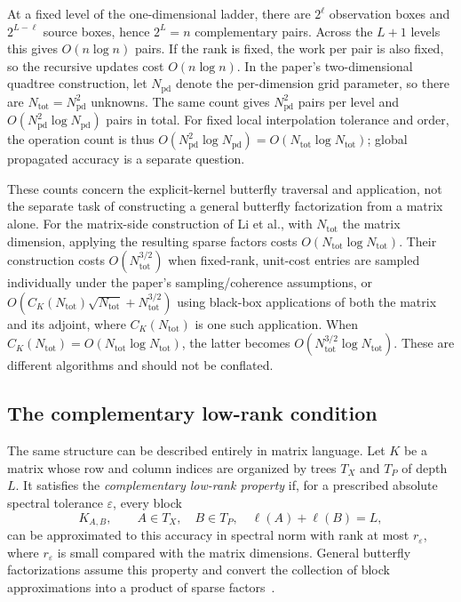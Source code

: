 \documentclass[11pt,a4paper]{article}
\begin{document}
At a fixed level of the one-dimensional ladder, there are $2^\ell$ observation boxes and $2^{L-\ell}$ source boxes, hence $2^L=n$ complementary pairs. Across the $L+1$ levels this gives $O(n\log n)$ pairs. If the rank is fixed, the work per pair is also fixed, so the recursive updates cost $O(n\log n)$. In the paper's two-dimensional quadtree construction, let $N_{\mathrm{pd}}$ denote the per-dimension grid parameter, so there are $N_{\mathrm{tot}}=N_{\mathrm{pd}}^2$ unknowns. The same count gives $N_{\mathrm{pd}}^2$ pairs per level and $O(N_{\mathrm{pd}}^2\log N_{\mathrm{pd}})$ pairs in total. For fixed local interpolation tolerance and order, the operation count is thus $O(N_{\mathrm{pd}}^2\log N_{\mathrm{pd}})=O(N_{\mathrm{tot}}\log N_{\mathrm{tot}})$; global propagated accuracy is a separate question.

These counts concern the explicit-kernel butterfly traversal and application, not the separate task of constructing a general butterfly factorization from a matrix alone. For the matrix-side construction of Li et al., with $N_{\mathrm{tot}}$ the matrix dimension, applying the resulting sparse factors costs $O(N_{\mathrm{tot}}\log N_{\mathrm{tot}})$. Their construction costs $O(N_{\mathrm{tot}}^{3/2})$ when fixed-rank, unit-cost entries are sampled individually under the paper's sampling/coherence assumptions, or $O(C_K(N_{\mathrm{tot}})\sqrt{N_{\mathrm{tot}}}+N_{\mathrm{tot}}^{3/2})$ using black-box applications of both the matrix and its adjoint, where $C_K(N_{\mathrm{tot}})$ is one such application. When $C_K(N_{\mathrm{tot}})=O(N_{\mathrm{tot}}\log N_{\mathrm{tot}})$, the latter becomes $O(N_{\mathrm{tot}}^{3/2}\log N_{\mathrm{tot}})$. These are different algorithms and should not be conflated.

\subsection{The complementary low-rank condition}
\label{subsec:complementary-low-rank}

The same structure can be described entirely in matrix language. Let $K$ be a matrix whose row and column indices are organized by trees $T_X$ and $T_P$ of depth $L$. It satisfies the \emph{complementary low-rank property} if, for a prescribed absolute spectral tolerance $\varepsilon$, every block
\begin{equation}
    K_{A,B},\qquad A\in T_X,\quad B\in T_P,
    \quad \ell(A)+\ell(B)=L,
\end{equation}
can be approximated to this accuracy in spectral norm with rank at most $r_\varepsilon$, where $r_\varepsilon$ is small compared with the matrix dimensions. General butterfly factorizations assume this property and convert the collection of block approximations into a product of sparse factors~\cite{li2015butterfly}.
\end{document}
